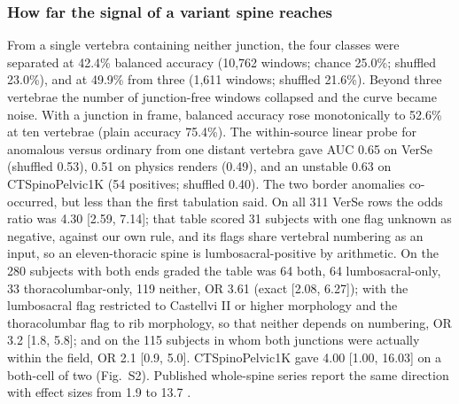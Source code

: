 \documentclass[11pt,letterpaper]{article}
\newcommand{\ci}[2]{[#1, #2]}
\begin{document}
\subsubsection*{How far the signal of a variant spine reaches}
From a single vertebra containing neither junction, the four classes were separated at 42.4\% balanced accuracy (10,762 windows; chance 25.0\%; shuffled 23.0\%), and at 49.9\% from three (1,611 windows; shuffled 21.6\%). Beyond three vertebrae the number of junction-free windows collapsed and the curve became noise. With a junction in frame, balanced accuracy rose monotonically to 52.6\% at ten vertebrae (plain accuracy 75.4\%). The within-source linear probe for anomalous versus ordinary from one distant vertebra gave AUC 0.65 on VerSe (shuffled 0.53), 0.51 on physics renders (0.49), and an unstable 0.63 on CTSpinoPelvic1K (54 positives; shuffled 0.40). The two border anomalies co-occurred, but less than the first tabulation said. On all 311 VerSe rows the odds ratio was 4.30 \ci{2.59}{7.14}; that table scored 31 subjects with one flag unknown as negative, against our own rule, and its flags share vertebral numbering as an input, so an eleven-thoracic spine is lumbosacral-positive by arithmetic. On the 280 subjects with both ends graded the table was 64 both, 64 lumbosacral-only, 33 thoracolumbar-only, 119 neither, OR 3.61 (exact \ci{2.08}{6.27}); with the lumbosacral flag restricted to Castellvi II or higher morphology and the thoracolumbar flag to rib morphology, so that neither depends on numbering, OR 3.2 \ci{1.8}{5.8}; and on the 115 subjects in whom both junctions were actually within the field, OR 2.1 \ci{0.9}{5.0}. CTSpinoPelvic1K gave 4.00 \ci{1.00}{16.03} on a both-cell of two (Fig.~S2). Published whole-spine series report the same direction with effect sizes from 1.9 to 13.7 \citep{jung2024}.


\end{document}
